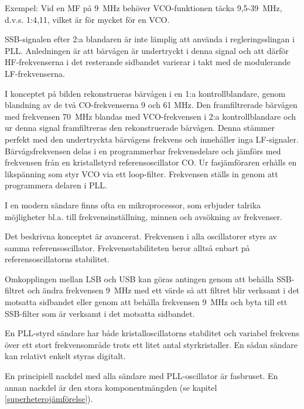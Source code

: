 Exempel: Vid en MF på 9~MHz behöver VCO-funktionen täcka 9,5-39~MHz,
d.v.s. 1:4,11, vilket är för mycket för en VCO.

SSB-signalen efter 2:a blandaren är inte lämplig att använda i
regleringsslingan i PLL. Anledningen är att bärvågen är undertryckt i
denna signal och att därför HF-frekvenserna i det resterande sidbandet
varierar i takt med de modulerande LF-frekvenserna.

I konceptet på bilden rekonstrueras bärvågen i en 1:a
kontrollblandare, genom blandning av de två CO-frekvenserna 9 och 61
MHz. Den framfiltrerade bärvågen med frekvensen 70~MHz blandas med
VCO-frekvensen i 2:a kontrollblandare och ur denna signal
framfiltreras den rekonstruerade bärvågen. Denna stämmer perfekt med
den undertryckta bärvågens frekvens och innehåller inga
LF-signaler. Bärvågsfrekvensen delas i en programmerbar frekvensdelare
och jämförs med frekvensen från en kristallstyrd referensoscillator
CO. Ur fasjämföraren erhålls en likspänning som styr VCO via ett
loop-filter. Frekvensen ställs in genom att programmera delaren i PLL.

I en modern sändare finns ofta en mikroprocessor, som erbjuder talrika
möjligheter bl.a. till frekvensinställning, minnen och avsökning av
frekvenser.

Det beskrivna konceptet är avancerat.  Frekvensen i alla oscillatorer
styrs av samma referensoscillator. Frekvensstabiliteten beror alltså
enbart på referensoscillatorns stabilitet.

Omkopplingen mellan LSB och USB kan göras antingen genom att behålla
SSB-filtret och ändra frekvensen 9~MHz med ett värde så att filtret
blir verksamt i det motsatta sidbandet eller genom att behålla
frekvensen 9~MHz och byta till ett SSB-filter som är verksamt i det
motsatta sidbandet.

En PLL-styrd sändare har både kristalloscillatorns stabilitet och
variabel frekvens över ett stort frekvensområde trots ett litet antal
styrkristaller. En sådan sändare kan relativt enkelt styras digitalt.

En principiell nackdel med alla sändare med PLL-oscillator är
fasbruset. En annan nackdel är den stora komponentmängden
(se kapitel \ref{superheterojämförelse}).
